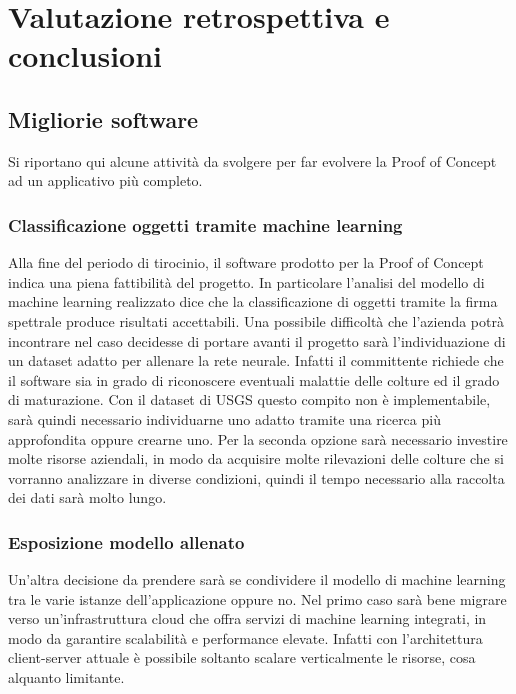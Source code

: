 
\chapter{Valutazione retrospettiva e conclusioni}
\label{cap:conclusione}


\section{Migliorie software}
Si riportano qui alcune attività da svolgere per far evolvere la Proof of Concept ad un applicativo più completo.

\subsection{Classificazione oggetti tramite machine learning}
Alla fine del periodo di tirocinio, il software prodotto per la Proof of Concept indica una piena fattibilità del progetto. In particolare l'analisi del modello di machine learning realizzato dice che la classificazione di oggetti tramite la firma spettrale produce risultati accettabili. Una possibile difficoltà che l'azienda potrà incontrare nel caso decidesse di portare avanti il progetto sarà l'individuazione di un dataset adatto per allenare la rete neurale. Infatti il committente richiede che il software sia in grado di riconoscere eventuali malattie delle colture ed il grado di maturazione. Con il dataset di USGS questo compito non è implementabile, sarà quindi necessario individuarne uno adatto tramite una ricerca più approfondita oppure crearne uno. Per la seconda opzione sarà necessario investire molte risorse aziendali, in modo da acquisire molte rilevazioni delle colture che si vorranno analizzare in diverse condizioni, quindi il tempo necessario alla raccolta dei dati sarà molto lungo.

\subsection{Esposizione modello allenato}
Un'altra decisione da prendere sarà se condividere il modello di machine learning tra le varie istanze dell'applicazione oppure no. Nel primo caso sarà bene migrare verso un'infrastruttura cloud che offra servizi di machine learning integrati, in modo da garantire scalabilità e performance elevate. Infatti con l'architettura client-server attuale è possibile soltanto scalare verticalmente le risorse, cosa alquanto limitante.

